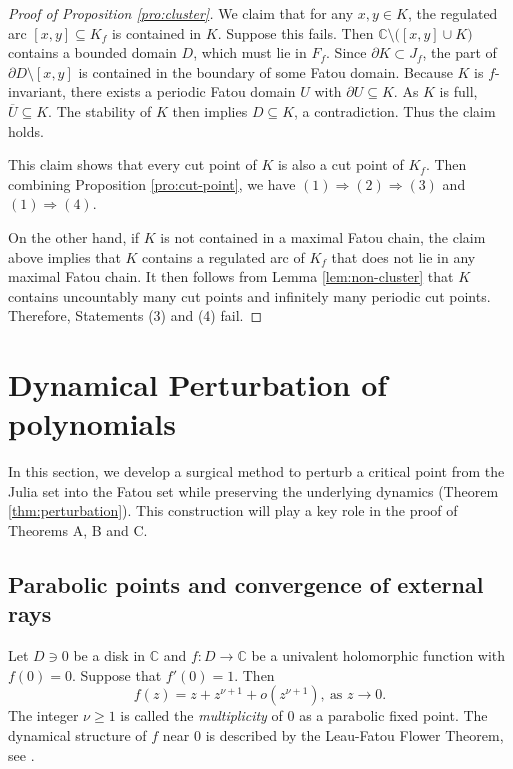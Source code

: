 \documentclass[a4paper,reqno,times, 11pt]{amsart}
\theoremstyle{remark}
\theoremstyle{plain}
\numberwithin{equation}{section}
\def\C{\mbox{$\mathbb C$}}
\begin{document}
	
	\begin{proof}[Proof of Proposition \ref{pro:cluster}]
	We claim that for any $x,y\in K$, the regulated arc $[x,y]\subseteq K_f$ is contained in $K$.
Suppose this fails. Then $\mathbb{C}\setminus\big([x,y]\cup K\big)$ contains a bounded domain $D$, which must lie in $F_f$.
Since $\partial K\subset J_f$, the part of $\partial D\setminus [x,y]$ is contained in the boundary of some Fatou domain.
Because $K$ is $f$-invariant, there exists a periodic Fatou domain $U$ with $\partial U\subseteq K$.
As $K$ is full, $\overline{U}\subseteq K$. The stability of $K$ then implies $D\subseteq K$, a contradiction.
Thus the claim holds.
	
	
	
	This claim shows that every cut point of $K$ is also a cut point of $K_f$. 	Then combining Proposition \ref{pro:cut-point},  we have  $(1)\Rightarrow (2)\Rightarrow (3)$ and $(1)\Rightarrow (4)$.
	
	On the other hand, if $K$ is not contained in a maximal Fatou chain, the claim above implies that $K$ contains a regulated arc of $K_f$ that does not lie in any maximal Fatou chain. It then follows from
	 Lemma \ref{lem:non-cluster} that $K$ contains uncountably many cut points and infinitely many periodic cut points. Therefore, Statements (3) and (4) fail.
	\end{proof}
	
	
	
	
		
	\section{Dynamical Perturbation of polynomials}\label{sec:pinching}
	
	
	
	
	In this section, we develop a surgical method to perturb a critical point from the Julia set into the Fatou set while preserving the underlying dynamics (Theorem \ref{thm:perturbation}).
	This construction will play a key role in the proof of Theorems A, B and C. %
	
	\subsection{Parabolic points and convergence of external rays}
	Let $D\ni 0$ be a disk in $\C$ and $f:D\to \C$ be a univalent holomorphic function with $f(0)=0$. Suppose that $f'(0)=1$. Then 
	\[f(z)=z+z^{\nu+1}+o(z^{\nu+1}),\ \text{as }z\to 0.\]
The integer $\nu\geq1$ is called the \emph{multiplicity} of $0$ as a parabolic fixed point. The dynamical structure of $f$ near $0$ is described by the  Leau-Fatou Flower Theorem, see \cite[Section 10]{Mil}.
\end{document}
